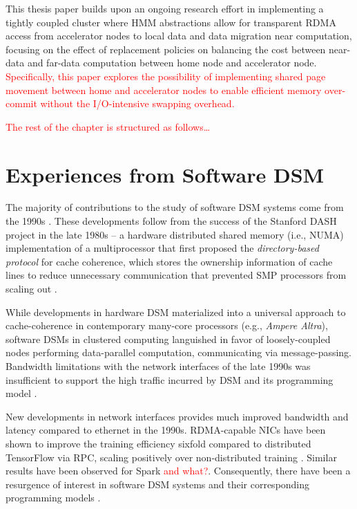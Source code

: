 \documentclass{article}
\begin{document}
This thesis paper builds upon an ongoing research effort in implementing a
tightly coupled cluster where HMM abstractions allow for transparent RDMA access
from accelerator nodes to local data and data migration near computation, focusing
on the effect of replacement policies on balancing the cost between near-data and
far-data computation between home node and accelerator node. \textcolor{red}{
Specifically, this paper explores the possibility of implementing shared page
movement between home and accelerator nodes to enable efficient memory over-commit
without the I/O-intensive swapping overhead.}

\textcolor{red}{The rest of the chapter is structured as follows\dots}

\section{Experiences from Software DSM}
The majority of contributions to the study of software DSM systems come from the
1990s \cites{Amza_etal.Treadmarks.1996}{Carter_Bennett_Zwaenepoel.Munin.1991}
{Itzkovitz_Schuster_Shalev.Millipede.1998}{Hu_Shi_Tang.JIAJIA.1999}. These
developments follow from the success of the Stanford DASH project in the late
1980s -- a hardware distributed shared memory (i.e., NUMA) implementation of a
multiprocessor that first proposed the \textit{directory-based protocol} for
cache coherence, which stores the ownership information of cache lines to reduce
unnecessary communication that prevented SMP processors from scaling out
\cite{Lenoski_etal.Stanford_DASH.1992}.

While developments in hardware DSM materialized into a universal approach to
cache-coherence in contemporary many-core processors (e.g., \textit{Ampere
Altra}\cite{WEB.Ampere..Ampere_Altra_Datasheet.2023}), software DSMs in clustered
computing languished in favor of loosely-coupled nodes performing data-parallel
computation, communicating via message-passing. Bandwidth limitations with the
network interfaces of the late 1990s was insufficient to support the high traffic
incurred by DSM and its programming model \cites{Werstein_Pethick_Huang.PerfAnalysis_DSM_MPI.2003}
{Lu_etal.MPI_vs_DSM_over_cluster.1995}.

New developments in network interfaces provides much improved bandwidth and latency
compared to ethernet in the 1990s. RDMA-capable NICs have been shown to improve
the training efficiency sixfold compared to distributed TensorFlow via RPC,
scaling positively over non-distributed training \cite{Jia_etal.Tensorflow_over_RDMA.2018}.
Similar results have been observed for Spark\cite{Lu_etal.Spark_over_RDMA.2014}
\textcolor{red}{and what?}. Consequently, there have been a resurgence of interest
in software DSM systems and their corresponding programming models
\cites{Nelson_etal.Grappa_DSM.2015}{Cai_etal.Distributed_Memory_RDMA_Cached.2018}.
\end{document}
